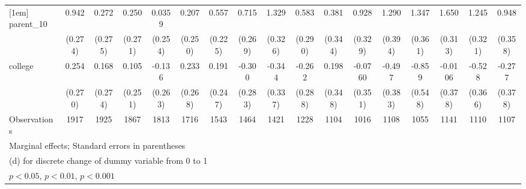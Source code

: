 {\begin{tabular}{l*{16}{c}}
[1em]
parent\_10           &       0.942\sym{***}&       0.272         &       0.250         &      0.0359         &       0.207         &       0.557\sym{*}  &       0.715\sym{**} &       1.329\sym{***}&       0.583\sym{*}  &       0.381         &       0.928\sym{**} &       1.290\sym{**} &       1.347\sym{***}&       1.650\sym{***}&       1.245\sym{***}&       0.948\sym{**} \\
                    &     (0.274)         &     (0.275)         &     (0.271)         &     (0.254)         &     (0.250)         &     (0.225)         &     (0.269)         &     (0.326)         &     (0.290)         &     (0.344)         &     (0.329)         &     (0.394)         &     (0.361)         &     (0.313)         &     (0.321)         &     (0.358)         \\
[1em]
college             &       0.254         &       0.168         &       0.105         &      -0.136         &       0.233         &       0.191         &      -0.300         &      -0.344         &      -0.262         &       0.198         &     -0.0760         &      -0.497         &      -0.859         &     -0.0106         &      -0.528         &      -0.277         \\
                    &     (0.270)         &     (0.274)         &     (0.251)         &     (0.263)         &     (0.268)         &     (0.247)         &     (0.283)         &     (0.337)         &     (0.288)         &     (0.348)         &     (0.351)         &     (0.383)         &     (0.548)         &     (0.378)         &     (0.366)         &     (0.378)         \\
\hline
Observations        &        1917         &        1925         &        1867         &        1813         &        1716         &        1543         &        1464         &        1421         &        1228         &        1104         &        1016         &        1108         &        1055         &        1141         &        1110         &        1107         \\
\hline\hline
\multicolumn{17}{l}{\footnotesize Marginal effects; Standard errors in parentheses}\\
\multicolumn{17}{l}{\footnotesize  (d) for discrete change of dummy variable from 0 to 1}\\
\multicolumn{17}{l}{\footnotesize \sym{*} \(p<0.05\), \sym{**} \(p<0.01\), \sym{***} \(p<0.001\)}\\
\end{tabular}
}
